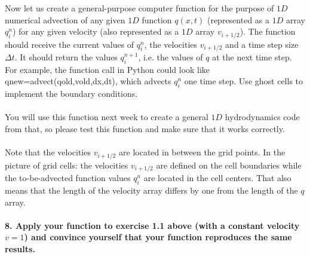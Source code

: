 Now let us create a general-purpose computer function for 
the purpose of $1D$ numerical advection of any given $1D$ 
function $q(x, t)$ (represented as a $1D$ array $q^n_i$) 
for any given velocity (also represented as a $1D$ array 
$v_{i+1/2}$). The function should receive the current
values of $q^n_i$, the velocities $v_{i+1/2}$ and a time 
step size $\Delta t$. It should return the values 
$q^{n+1}_i$, i.e. the values of $q$ at the next time step. 
For example, the function call in Python could look like 
qnew=advect(qold,vold,dx,dt), which advects $q^n_i$ one 
time step. Use ghost cells to implement the boundary 
conditions. \\
\\
You will use this function next week to create 
a general $1D$ hydrodynamics code from that, so please test 
this function and make sure that it works correctly. \\
\\
Note that the velocities $v_{i+1/2}$ are located in between 
the grid points. In the picture of grid cells: the 
velocities $v_{i+1/2}$ are defined on the cell boundaries 
while the to-be-advected function values $q^n_i$ are 
located in the cell centers. That also means that the 
length of the velocity array differs by one from the 
length of the $q$ array.

\paragraph{8. Apply your function to exercise 1.1 above 
    (with a constant velocity $v=1$) and convince yourself 
    that your function reproduces the same results.
} \ \\
    \\
    
    \newpage
    

\newpage
